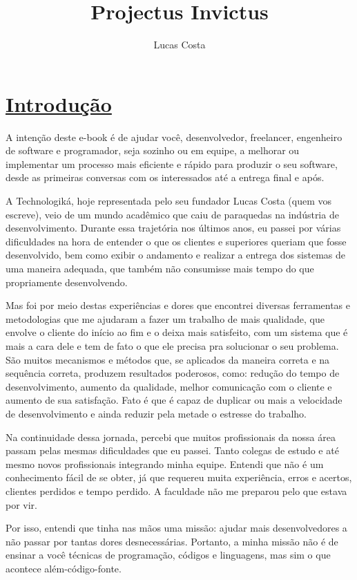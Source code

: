 \documentclass[a4paper, 12pt, oneside]{book}
\title{Projectus Invictus}
\author{Lucas Costa}
\begin{document}
\maketitle

\chapter*{\underline{Introdução}}

A intenção deste e-book é de ajudar você, desenvolvedor, freelancer, engenheiro de software e programador, seja sozinho ou em equipe, a melhorar ou implementar um processo mais eficiente e rápido para produzir o seu software, desde as primeiras conversas com os interessados até a entrega final e após.

A Technologiká, hoje representada pelo seu fundador Lucas Costa (quem vos escreve), veio de um mundo acadêmico que caiu de paraquedas na indústria de desenvolvimento. Durante essa trajetória nos últimos anos, eu passei por várias dificuldades na hora de entender o que os clientes e superiores queriam que fosse desenvolvido, bem como exibir o andamento e realizar a entrega dos sistemas de uma maneira adequada, que também não consumisse mais tempo do que propriamente desenvolvendo.

Mas foi por meio destas experiências e dores que encontrei diversas ferramentas e metodologias que me ajudaram a fazer um trabalho de mais qualidade, que envolve o cliente do início ao fim e o deixa mais satisfeito, com um sistema que é mais a cara dele e tem de fato o que ele precisa pra solucionar o seu problema. São muitos mecanismos e métodos que, se aplicados da maneira correta e na sequência correta, produzem resultados poderosos, como: redução do tempo de desenvolvimento, aumento da qualidade, melhor comunicação com o cliente e aumento de sua satisfação. Fato é que é capaz de duplicar ou mais a velocidade de desenvolvimento e ainda reduzir pela metade o estresse do trabalho.

Na continuidade dessa jornada, percebi que muitos profissionais da nossa área passam pelas mesmas dificuldades que eu passei. Tanto colegas de estudo e até mesmo novos profissionais integrando minha equipe. Entendi que não é um conhecimento fácil de se obter, já que requereu muita experiência, erros e acertos, clientes perdidos e tempo perdido. A faculdade não me preparou pelo que estava por vir.

Por isso, entendi que tinha nas mãos uma missão: ajudar mais desenvolvedores a não passar por tantas dores desnecessárias. Portanto, a minha missão não é de ensinar a você técnicas de programação, códigos e linguagens, mas sim o que acontece além-código-fonte.
\end{document}
